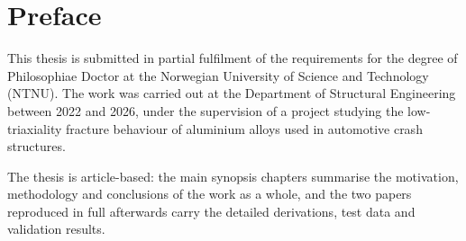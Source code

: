 \chapter*{Preface}

This thesis is submitted in partial fulfilment of the requirements for the
degree of Philosophiae Doctor at the Norwegian University of Science and
Technology (NTNU). The work was carried out at the Department of Structural
Engineering between 2022 and 2026, under the supervision of a project
studying the low-triaxiality fracture behaviour of aluminium alloys used in
automotive crash structures.

The thesis is article-based: the main synopsis chapters summarise the
motivation, methodology and conclusions of the work as a whole, and the two
papers reproduced in full afterwards carry the detailed derivations, test
data and validation results.

\vspace{\fill}
\prefaceSignature

